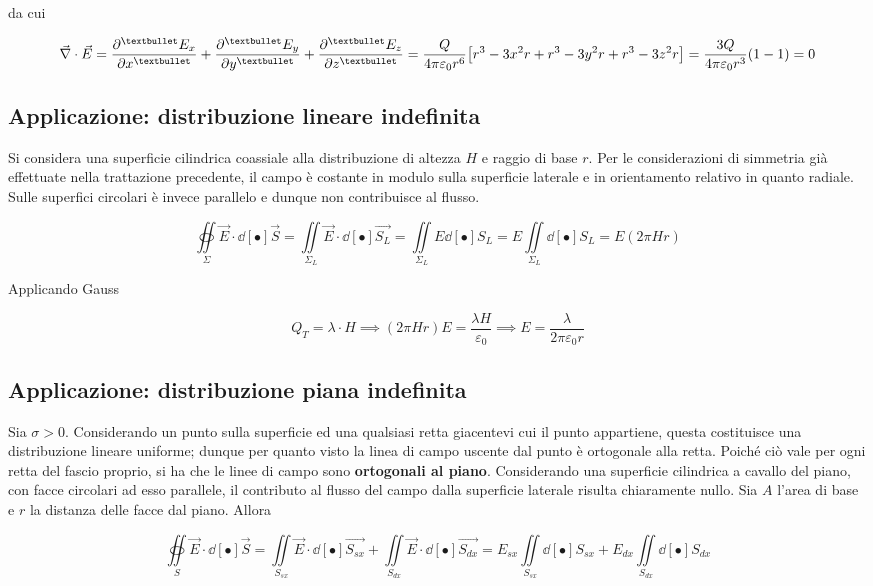 da cui

\[\vec{\nabla} \cdot \vec{E} = \pdv[•]{E_x}{x} + \pdv[•]{E_y}{y} + \pdv[•]{E_z}{z} = \frac{Q}{4 \pi \varepsilon_0 r^6} \big[r^3 - 3x^2 r + r^3 - 3y^2 r + r^3 - 3z^2 r\big] = \frac{3 Q}{4 \pi \varepsilon_0 r^3} (1-1) = 0\]


\subsection{Applicazione: distribuzione lineare indefinita}

Si considera una superficie cilindrica coassiale alla distribuzione di altezza $H$ e raggio di base $r$. Per le considerazioni di simmetria già effettuate nella trattazione precedente, il campo è costante in modulo sulla superficie laterale e in orientamento relativo in quanto radiale. Sulle superfici circolari è invece parallelo e dunque non contribuisce al flusso.

\[\oiint\limits_{\Sigma} \vec{E} \cdot \dd[•]{\vec{S}} = \iint\limits_{\Sigma_L} \vec{E} \cdot \dd[•]{\vec{S_L}} = \iint\limits_{\Sigma_L} E \dd[•]{S_L} = E  \iint\limits_{\Sigma_L}\dd[•]{S_L} = E (2 \pi H r)\]

Applicando Gauss

\[Q_T = \lambda \cdot H \implies (2 \pi H r) E = \frac{\lambda H}{\varepsilon_0} \implies E = \frac{\lambda}{2 \pi \varepsilon_0 r}\]


\subsection{Applicazione: distribuzione piana indefinita}
Sia $\sigma > 0$. Considerando un punto sulla superficie ed una qualsiasi retta giacentevi cui il punto appartiene, questa costituisce una distribuzione lineare uniforme; dunque per quanto visto la linea di campo uscente dal punto è ortogonale alla retta. Poiché ciò vale per ogni retta del fascio proprio, si ha che le linee di campo sono \textbf{ortogonali al piano}. Considerando una superficie cilindrica a cavallo del piano, con facce circolari ad esso parallele, il contributo al flusso del campo dalla superficie laterale risulta chiaramente nullo. Sia $A$ l'area di base e $r$ la distanza delle facce dal piano. Allora 

\[\oiint\limits_{S} \vec{E} \cdot \dd[•]{\vec{S}} = \iint\limits_{S_{sx}} \vec{E} \cdot \dd[•]{\vec{S_{sx}}} + \iint\limits_{S_{dx}} \vec{E} \cdot \dd[•]{\vec{S_{dx}}} = E_{sx} \iint\limits_{S_{sx}}\dd[•]{S_{sx}} + E_{dx} \iint\limits_{S_{dx}}\dd[•]{S_{dx}}\]

